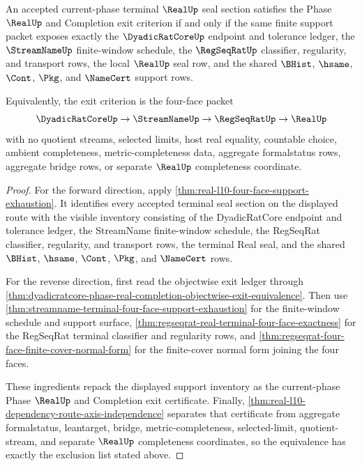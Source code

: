 \begin{theorem}
\label{thm:real-l10-four-face-exit-criterion-equivalence}
An accepted current-phase terminal $\RealUp$ seal section satisfies the Phase $\RealUp$ and Completion exit criterion if and only if the same finite support packet exposes exactly the $\DyadicRatCoreUp$ endpoint and tolerance ledger, the $\StreamNameUp$ finite-window schedule, the $\RegSeqRatUp$ classifier, regularity, and transport rows, the local $\RealUp$ seal row, and the shared $\BHist$, $\hsame$, $\Cont$, $\Pkg$, and $\NameCert$ support rows.

Equivalently, the exit criterion is the four-face packet
$$
\DyadicRatCoreUp \to \StreamNameUp \to \RegSeqRatUp \to \RealUp
$$
with no quotient streams, selected limits, host real equality, countable choice, ambient completeness, metric-completeness data, aggregate formalstatus rows, aggregate bridge rows, or separate $\RealUp$ completeness coordinate.
\end{theorem}
\begin{proof}
For the forward direction, apply \autoref{thm:real-l10-four-face-support-exhaustion}. It identifies every accepted terminal seal section on the displayed route with the visible inventory consisting of the DyadicRatCore endpoint and tolerance ledger, the StreamName finite-window schedule, the RegSeqRat classifier, regularity, and transport rows, the terminal Real seal, and the shared $\BHist$, $\hsame$, $\Cont$, $\Pkg$, and $\NameCert$ rows.

For the reverse direction, first read the objectwise exit ledger through \autoref{thm:dyadicratcore-phase-real-completion-objectwise-exit-equivalence}. Then use \autoref{thm:streamname-terminal-four-face-support-exhaustion} for the finite-window schedule and support surface, \autoref{thm:regseqrat-real-terminal-four-face-exactness} for the RegSeqRat terminal classifier and regularity rows, and \autoref{thm:regseqrat-four-face-finite-cover-normal-form} for the finite-cover normal form joining the four faces.

These ingredients repack the displayed support inventory as the current-phase Phase $\RealUp$ and Completion exit certificate. Finally, \autoref{thm:real-l10-dependency-route-axis-independence} separates that certificate from aggregate formalstatus, leantarget, bridge, metric-completeness, selected-limit, quotient-stream, and separate $\RealUp$ completeness coordinates, so the equivalence has exactly the exclusion list stated above.
\end{proof}

